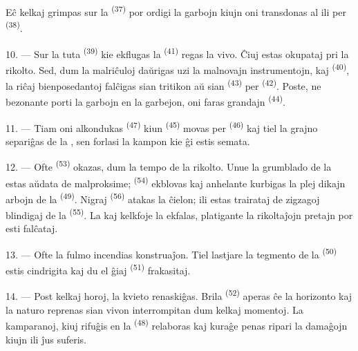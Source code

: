Eĉ kelkaj grimpas sur la  \textsuperscript{(37)} por ordigi la
garbojn kiujn oni transdonas al ili per 
\textsuperscript{(38)}.

10. --- Sur la tuta  \textsuperscript{(39)} kie ekflugas la
 \textsuperscript{(41)} regas la vivo. Ĉiuj estas okupataj pri
la rikolto. Sed, dum la malriĉuloj daŭrigas uzi la malnovajn instrumentojn,
 kaj 
\textsuperscript{(40)}, la riĉaj bienposedantoj falĉigas sian tritikon aŭ sian
 \textsuperscript{(43)} per 
\textsuperscript{(42)}. Poste, ne bezonante porti la garbojn en la garbejon,
oni faras grandajn  \textsuperscript{(44)}.

11. --- Tiam oni alkondukas  \textsuperscript{(47)} kiun
 \textsuperscript{(45)} movas per 
\textsuperscript{(46)} kaj tiel la grajno separiĝas de la , sen
forlasi la kampon kie ĝi estis semata.

\VUsaut{5.0mm}
\VUsaut{3.4mm}

12. --- Ofte  \textsuperscript{(53)} okazas, dum la tempo de
la rikolto. Unue la grumblado de la  estas aŭdata de
malproksime;  \textsuperscript{(54)} ekblovas kaj
anhelante kurbigas la plej dikajn arbojn de la 
\textsuperscript{(49)}. Nigraj  \textsuperscript{(56)} atakas la
ĉielon; ili estas trairataj de zigzagoj blindigaj de la 
\textsuperscript{(55)}. La  kaj kelkfoje la 
ekfalas, platigante la rikoltaĵojn pretajn por esti falĉataj.

13. --- Ofte la fulmo incendias konstruaĵon. Tiel lastjare la tegmento de la
 \textsuperscript{(50)} estis cindrigita kaj du el ĝiaj
 \textsuperscript{(51)} frakasitaj.

14. --- Post kelkaj horoj, la kvieto renaskiĝas. Brila 
\textsuperscript{(52)} aperas ĉe la horizonto kaj la naturo reprenas sian
vivon interrompitan dum kelkaj momentoj. La kamparanoj, kiuj rifuĝis en la
 \textsuperscript{(48)} relaboras kaj kuraĝe penas ripari la
damaĝojn kiujn ili ĵus suferis.

\VUsaut{6.0mm}
\VUsaut{3.6mm}

